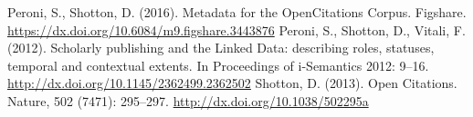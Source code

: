 \documentclass[runningheads,a4paper]{llncs}
\begin{document}
\begin{thebibliography}{4}
 Peroni, S., Shotton, D. (2016). Metadata for the OpenCitations Corpus. Figshare. \url{https://dx.doi.org/10.6084/m9.figshare.3443876}
 Peroni, S., Shotton, D., Vitali, F. (2012). Scholarly publishing and the Linked Data: describing roles, statuses, temporal and contextual extents. In Proceedings of i-Semantics 2012: 9--16. \url{http://dx.doi.org/10.1145/2362499.2362502}
 Shotton, D. (2013). Open Citations. Nature, 502 (7471): 295--297. \url{http://dx.doi.org/10.1038/502295a}

\end{thebibliography}
\end{document}
